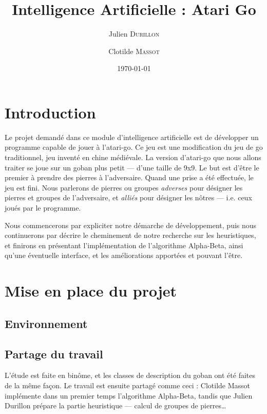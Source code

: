 \documentclass[11pt,a4paper,titlepage,french]{article}
\title{Intelligence Artificielle : Atari Go}
\author{Julien \textsc{Durillon} \and Clotilde \textsc{Massot}}
\date{\today}
\begin{document}
	

	\tableofcontents
	\clearpage


	\section*{Introduction}
		Le projet demandé dans ce module d'intelligence artificielle est de développer un programme capable de jouer à l'atari-go. Ce jeu est une modification du jeu de go traditionnel, jeu inventé en chine médiévale. La version d'atari-go que nous allons traiter se joue sur un goban plus petit --- d'une taille de 9x9. Le but est d'être le premier à prendre des pierres à l'adversaire. Quand une prise a été effectuée, le jeu est fini. Nous parlerons de pierres ou groupes \emph{adverses} pour désigner les pierres et groupes de l'adversaire, et \emph{alliés} pour désigner les nôtres --- i.e. ceux joués par le programme.

		Nous commencerons par expliciter notre démarche de développement, puis nous continuerons par décrire le cheminement de notre recherche sur les heuristiques, et finirons en présentant l'implémentation de l'algorithme Alpha-Beta, ainsi qu'une éventuelle interface, et les améliorations apportées et pouvant l'être.

	\section{Mise en place du projet}
		\subsection{Environnement}
		\subsection{Partage du travail}
			L'étude est faite en binôme, et les classes de description du goban ont été faites de la même façon. Le travail est ensuite partagé comme ceci : Clotilde Massot implémente dans un premier temps l'algorithme Alpha-Beta, tandis que Julien Durillon prépare la partie heuristique --- calcul de groupes de pierres\dots %
\end{document}
